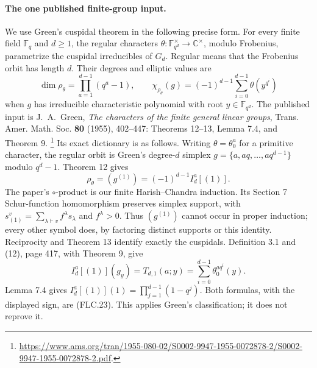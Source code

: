\documentclass[11pt,a4paper]{article}
\numberwithin{equation}{section}
\theoremstyle{remark}\newtheorem{remark}[theorem]{Remark}
\begin{document}
\paragraph{The one published finite-group input.}
We use Green's cuspidal theorem in the following precise form.
For every finite field $\mathbb F_q$ and $d\ge1$, the regular
characters $\theta:\mathbb F_{q^d}^{\times}\to\mathbb C^\times$,
modulo Frobenius, parametrize the cuspidal irreducibles of
$G_d$.  Regular means that the Frobenius orbit has length $d$.
Their degrees and elliptic values are
\[
 \dim\rho_\theta=\prod_{a=1}^{d-1}(q^a-1),\qquad
 \chi_{\rho_\theta}(g)=(-1)^{d-1}
                     \sum_{i=0}^{d-1}\theta(y^{q^i})
 \tag{FLC.23}
\]
when $g$ has irreducible characteristic polynomial with root
$y\in\mathbb F_{q^d}$.
The published input is
J.~A.~Green, \emph{The characters of the finite general linear
groups}, Trans. Amer. Math. Soc. \textbf{80} (1955), 402--447:
Theorems 12--13, Lemma 7.4, and Theorem 9.
\footnote{\url{https://www.ams.org/tran/1955-080-02/S0002-9947-1955-0072878-2/S0002-9947-1955-0072878-2.pdf}.}
Its exact dictionary is as follows.  Writing $\theta=\theta_0^a$
for a primitive character, the regular orbit is Green's
degree-$d$ simplex $g=\{a,aq,\ldots,aq^{d-1}\}$ modulo $q^d-1$.
Theorem 12 gives
\[
 \rho_\theta=(g^{(1)})=(-1)^{d-1}I_d^a[(1)].
\]
The paper's $\circ$-product is our finite Harish--Chandra induction.
Its Section 7 Schur-function homomorphism preserves simplex
support, with $s_{(1)}^v=\sum_{\lambda\vdash v}f^\lambda s_\lambda$
and $f^\lambda>0$.  Thus $(g^{(1)})$ cannot occur in proper
induction; every other symbol does, by factoring distinct
supports or this identity.  Reciprocity and Theorem 13 identify
exactly the cuspidals.  Definition 3.1 and (12), page 417,
with Theorem 9, give
\[
 I_d^a[(1)](g_y)=T_{d,1}(a;y)
                    =\sum_{i=0}^{d-1}\theta_0^{a q^i}(y).
\]
Lemma 7.4 gives
$I_d^a[(1)](1)=\prod_{j=1}^{d-1}(1-q^j)$.
Both formulas, with the displayed sign, are (FLC.23).
This applies Green's classification; it does not reprove it.

\end{document}
